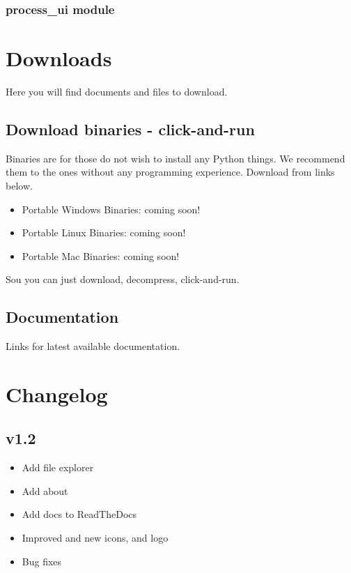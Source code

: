 \documentclass[a4paper,10pt,english]{sphinxmanual}
\begin{document}
\subsection{process\_ui module}
\label{\detokenize{autodoc/scripts/process_ui:process-ui-module}}\label{\detokenize{autodoc/scripts/process_ui::doc}}

\chapter{Downloads}
\label{\detokenize{download:downloads}}\label{\detokenize{download::doc}}
Here you will find documents and files to download.


\section{Download binaries - click-and-run}
\label{\detokenize{download:download-binaries-click-and-run}}
Binaries are for those do not wish to install any Python things.
We recommend them to the ones without any programming experience.
Download from links below.
\begin{itemize}
\item {} 
Portable Windows Binaries: coming soon!

\item {} 
Portable Linux Binaries: coming soon!

\item {} 
Portable Mac Binaries: coming soon!

\end{itemize}

Sou you can just download, decompress, click-and-run.


\section{Documentation}
\label{\detokenize{download:documentation}}
Links for latest available documentation.


\chapter{Changelog}
\label{\detokenize{changes:changelog}}\label{\detokenize{changes::doc}}

\section{v1.2}
\label{\detokenize{changes:v1-2}}\begin{itemize}
\item {} 
Add file explorer

\item {} 
Add about

\item {} 
Add docs to ReadTheDocs

\item {} 
Improved and new icons, and logo

\item {} 
Bug fixes

\end{itemize}
\end{document}
